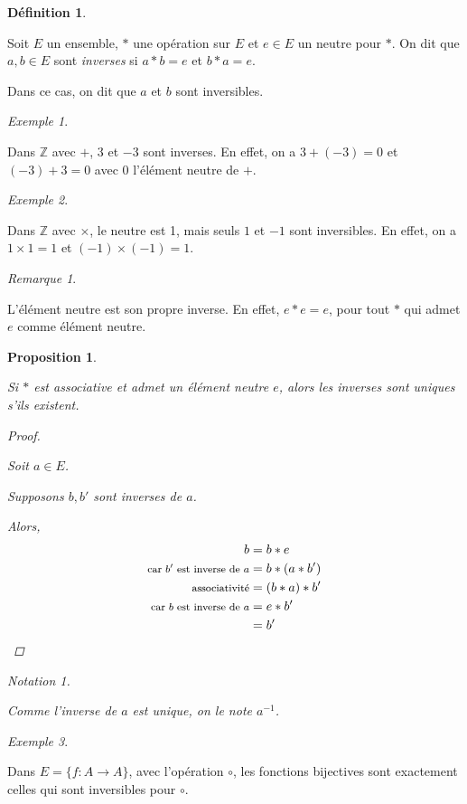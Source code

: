 \documentclass{report}
\newcommand*{\entiers}{\mathbb{Z}}
\newtheorem*{prop}{Proposition}
\theoremstyle{definition}
\newtheorem*{defin}{D\'efinition}
\theoremstyle{remark}
\newtheorem*{exem}{Exemple}
\newtheorem*{nota}{Notation}
\newtheorem*{rema}{Remarque}
\begin{document}
	\begin{defin}
		~

		Soit $E$ un ensemble, $*$ une op\'eration sur $E$ et $e \in E$ un neutre pour $*$. On dit que $a,b \in E$ sont \emph{inverses} si $a*b=e$ et $b*a=e$.

		Dans ce cas, on dit que $a$ et $b$ sont inversibles.
	\end{defin}
	\begin{exem}
		~

		Dans $\entiers$ avec $+$, $3$ et $-3$ sont inverses. En effet, on a $3+(-3)=0$ et $(-3)+3=0$ avec $0$ l'\'el\'ement neutre de $+$.
	\end{exem}
	\begin{exem}
		~

		Dans $\entiers$ avec $\times$, le neutre est 1, mais seuls $1$ et $-1$ sont inversibles. En effet, on a $1 \times 1=1$ et $(-1) \times (-1)=1$.
	\end{exem}
	\begin{rema}
		~

		L'\'el\'ement neutre est son propre inverse. En effet, $e*e=e$, pour tout $*$ qui admet $e$ comme \'el\'ement neutre.
	\end{rema}
	\begin{prop}
		~

		Si $*$ est associative et admet un \'el\'ement neutre $e$, alors les inverses sont uniques s'ils existent.
		\begin{proof}~

			Soit $a \in E$.

			Supposons $b,b'$ sont inverses de $a$.

			Alors,
			\begin{align*}
				b&=b*e\\
				\text{\footnotesize car $b'$ est inverse de $a$}&=b*(a*b')\\
				\text{\footnotesize associativit\'e}&=(b*a)*b'\\
				\text{\footnotesize car $b$ est inverse de $a$}&=e*b'\\
				&=b'
			\end{align*}
		\end{proof}
		\begin{nota}
			~

			Comme l'inverse de $a$ est unique, on le note $a^{-1}$.
		\end{nota}
	\end{prop}
	\begin{exem}
		~

		Dans $E=\{f:A \to A\}$, avec l'op\'eration $\circ$, les fonctions bijectives sont exactement celles qui sont inversibles pour $\circ$.
	\end{exem}
\end{document}
